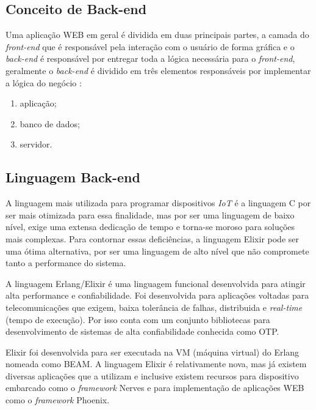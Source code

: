 \documentclass[../../layout.tex]{subfiles}
\begin{document}
\subsection{Conceito de Back-end}
\hspace*{3em}Uma aplicação WEB em geral é dividida  em duas principais partes, a camada do \emph{front-end} que é responsável pela interação com o usuário de forma gráfica e o \emph{back-end} é responsável por entregar toda a lógica necessária para o \emph{front-end}, geralmente o \emph{back-end} é dividido em três elementos responsáveis por implementar a lógica do negócio \cite{16}:

\begin{enumerate}[label=\alph*)]
\itemsep0em
    \item aplicação;
    \item banco de dados;
    \item servidor.
\end{enumerate}

\subsection{Linguagem Back-end}
\hspace*{3em}A linguagem mais utilizada para programar dispositivos \emph{IoT} é a linguagem C por ser mais otimizada para essa finalidade, mas por ser uma linguagem de baixo nível, exige uma extensa dedicação de tempo e torna-se moroso para soluções mais complexas. Para contornar essas deficiências, a linguagem Elixir pode ser uma ótima alternativa, por ser uma linguagem de alto nível que não compromete tanto a performance do sistema.\par

A linguagem Erlang/Elixir é uma linguagem funcional desenvolvida para atingir alta performance e confiabilidade. Foi desenvolvida para aplicações voltadas para telecomunicações que exigem, baixa tolerância de falhas, distribuida e \emph{real-time} (tempo de execução). Por isso conta com um conjunto bibliotecas para desenvolvimento de sistemas de alta confiabilidade conhecida como OTP.\par
Elixir foi desenvolvida para ser executada na VM (máquina virtual) do Erlang nomeada como BEAM. A linguagem Elixir é relativamente nova, mas já existem diversas aplicações que a utilizam e inclusive existem recursos para dispositivo embarcado como o \emph{framework} Nerves \cite{ElixirorIoT} e para implementação de aplicações WEB como o \emph{framework} Phoenix.
\end{document}
